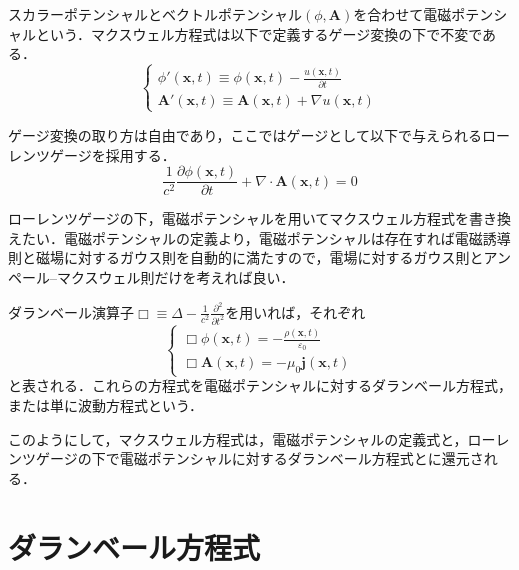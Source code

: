 \documentclass[10pt, a5paper, twoside]{jsarticle}
\theoremstyle{definition}
\begin{document}
		スカラーポテンシャルとベクトルポテンシャル$(\phi, \boldsymbol{A})$を合わせて電磁ポテンシャルという．マクスウェル方程式は以下で定義するゲージ変換の下で不変である．
		\begin{equation*}
			\begin{cases}
				\phi' (\boldsymbol{x}, t) \equiv \phi (\boldsymbol{x}, t) - \displaystyle \frac{u (\boldsymbol{x}, t)}{\partial t} \\ \boldsymbol{A}' (\boldsymbol{x}, t) \equiv \boldsymbol{A} (\boldsymbol{x}, t) + \nabla u(\boldsymbol{x}, t)
			\end{cases}
		\end{equation*}

		ゲージ変換の取り方は自由であり，ここではゲージとして以下で与えられるローレンツゲージを採用する．
		\begin{equation*}
			\displaystyle \frac{1}{c^2} \frac{\partial \phi (\boldsymbol{x}, t)}{\partial t} + \nabla \cdot \boldsymbol{A}(\boldsymbol{x}, t) = 0
		\end{equation*}

		ローレンツゲージの下，電磁ポテンシャルを用いてマクスウェル方程式を書き換えたい．電磁ポテンシャルの定義より，電磁ポテンシャルは存在すれば電磁誘導則と磁場に対するガウス則を自動的に満たすので，電場に対するガウス則とアンペール--マクスウェル則だけを考えれば良い．

		ダランベール演算子$\Box \equiv \Delta - \displaystyle \frac{1}{c^2} \frac{{\partial}^2}{\partial t^2}$を用いれば，それぞれ
		\begin{equation*}
			\begin{cases}
				\Box \phi (\boldsymbol{x}, t) = - \displaystyle \frac{\rho (\boldsymbol{x}, t)}{\varepsilon_0} \\ \Box \boldsymbol{A}(\boldsymbol{x}, t) = - \mu_0 \boldsymbol{j} (\boldsymbol{x}, t)
			\end{cases}
		\end{equation*}
		と表される．これらの方程式を電磁ポテンシャルに対するダランベール方程式，または単に波動方程式という．

		このようにして，マクスウェル方程式は，電磁ポテンシャルの定義式と，ローレンツゲージの下で電磁ポテンシャルに対するダランベール方程式とに還元される．

	\section{ダランベール方程式}
\end{document}
